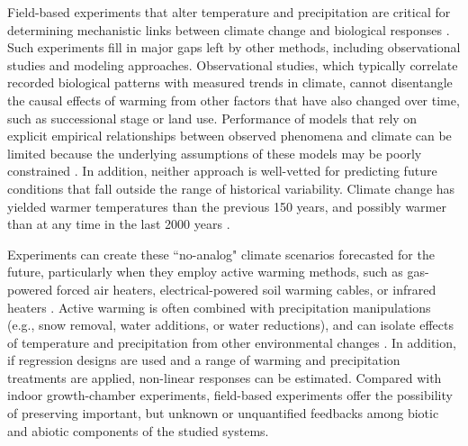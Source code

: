 \documentclass{article}
\begin{document}
\par Field-based experiments that alter temperature and precipitation are critical for determining mechanistic links between climate change and biological responses \citep[e.g.,][]{box1978,williams2007,gelman2014}. Such experiments fill in major gaps left by other methods, including observational studies and modeling approaches. Observational studies, which typically correlate recorded biological patterns with measured trends in climate, cannot disentangle the causal effects of warming from other factors that have also changed over time, such as successional stage or land use. Performance of models that rely on explicit empirical relationships between observed phenomena and climate can be limited because the underlying assumptions of these models may be poorly constrained \citep [e.g.,][]{pearson2004,ibanez2006,swab2012,chuine2016}. 
In addition, neither approach is well-vetted for predicting future conditions that fall outside the range of historical variability. Climate change has yielded warmer temperatures than the previous 150 years, and possibly warmer than at any time in the last 2000 years \citep{ohlemuller2006,williams2007,williams2007b,ipcc2013}.  

\par Experiments can create these ``no-analog" climate scenarios forecasted for the future, particularly when they employ active warming methods, such as gas-powered forced air heaters, electrical-powered soil warming cables, or infrared heaters \citep{shaver2000,williams2007b,aronson2009}. Active warming is often combined with precipitation manipulations (e.g., snow removal, water additions, or water reductions), and can isolate effects of temperature and precipitation from other environmental changes \citep [e.g.,][]{price1998,cleland2006,sherry2007,rollinson2012}. In addition, if regression designs are used \citep[e.g.,][]{pelini2011} and a range of warming and precipitation treatments are applied, non-linear responses can be estimated. Compared with indoor growth-chamber experiments, field-based experiments offer the possibility of preserving important, but unknown or unquantified feedbacks among biotic and abiotic components of the studied systems. 
\end{document}
